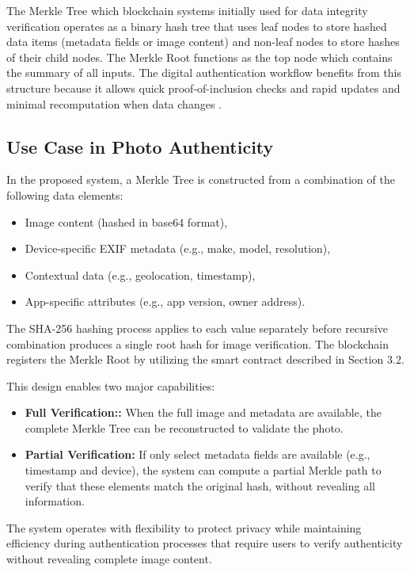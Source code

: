 The Merkle Tree which blockchain systems initially used for data integrity verification operates as a binary hash tree that uses leaf nodes to store hashed data items (metadata fields or image content) and non-leaf nodes to store hashes of their child nodes. The Merkle Root functions as the top node which contains the summary of all inputs. The digital authentication workflow benefits from this structure because it allows quick proof-of-inclusion checks and rapid updates and minimal recomputation when data changes \cite{forensicAnalysisOfJPEG}.

\subsection{Use Case in Photo Authenticity}
In the proposed system, a Merkle Tree is constructed from a combination of the following data elements:
\begin{itemize}
    \item Image content (hashed in base64 format),
    \item Device-specific EXIF metadata (e.g., make, model, resolution),
    \item Contextual data (e.g., geolocation, timestamp),
    \item App-specific attributes (e.g., app version, owner address).
\end{itemize}

The SHA-256 hashing process applies to each value separately before recursive combination produces a single root hash for image verification. The blockchain registers the Merkle Root by utilizing the smart contract described in Section 3.2.

This design enables two major capabilities:
\begin{itemize}
    \item {\textbf{Full Verification::}} When the full image and metadata are available, the complete Merkle Tree can be reconstructed to validate the photo.
    \item {\textbf{Partial Verification:}} If only select metadata fields are available (e.g., timestamp and device), the system can compute a partial Merkle path to verify that these elements match the original hash, without revealing all information.
\end{itemize}

The system operates with flexibility to protect privacy while maintaining efficiency during authentication processes that require users to verify authenticity without revealing complete image content.

